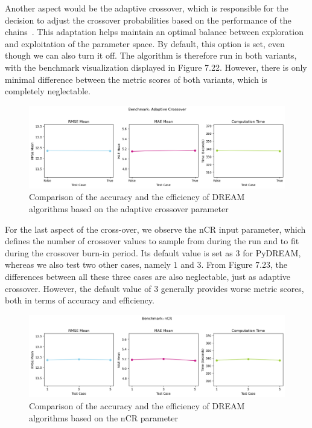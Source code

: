 Another aspect would be the adaptive crossover, which is responsible for the decision to adjust the crossover probabilities based on the performance of the chains~\cite{dream}. This adaptation helps maintain an optimal balance between exploration and exploitation of the parameter space. By default, this option is set, even though we can also turn it off. The algorithm is therefore run in both variants, with the benchmark visualization displayed in Figure 7.22. However, there is only minimal difference between the metric scores of both variants, which is completely neglectable. 
\begin{figure}[H]
    \centering
    \includegraphics[width=1\textwidth]{figures/dream/adaptive_crossover.png}
    \captionsetup{width=.8\textwidth}
    \caption{Comparison of the accuracy and the efficiency of DREAM algorithms based on the adaptive crossover parameter}
    \label{fig:enter-label}
\end{figure}

For the last aspect of the cross-over, we observe the nCR input parameter, which defines the number of crossover values to sample from during the run and to fit during the crossover burn-in period. Its default value is set as $3$ for PyDREAM, whereas we also test two other cases, namely $1$ and $3$. From Figure 7.23, the differences between all these three cases are also neglectable, just as adaptive crossover. However, the default value of $3$ generally provides worse metric scores, both in terms of accuracy and efficiency.
\begin{figure}[H]
    \centering
    \includegraphics[width=1\textwidth]{figures/dream/nCR.png}
    \captionsetup{width=.8\textwidth}
    \caption{Comparison of the accuracy and the efficiency of DREAM algorithms based on the nCR parameter}
    \label{fig:enter-label}
\end{figure}


